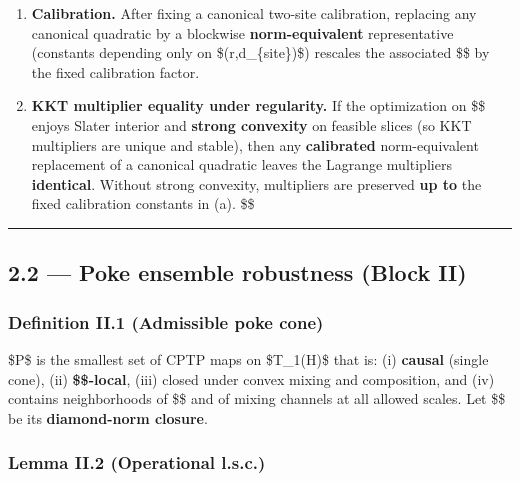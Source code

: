 \documentclass[
]{article}
\numberwithin{equation}{section}
\begin{document}
\begin{enumerate}
\def\labelenumi{(\alph{enumi})}
\item
  \textbf{Calibration.} After fixing a canonical two-site calibration,
  replacing any canonical quadratic by a blockwise
  \textbf{norm-equivalent} representative (constants depending only on
  \$(r,d\_\{\rm site\})\$) rescales the associated \$\alpha\$ by the
  fixed calibration factor.
\item
  \textbf{KKT multiplier equality under regularity.} If the optimization
  on \$\$ enjoys Slater interior and \textbf{strong
  convexity} on feasible slices (so KKT multipliers are unique and
  stable), then any \textbf{calibrated} norm-equivalent replacement of a
  canonical quadratic leaves the Lagrange multipliers
  \textbf{identical}. Without strong convexity, multipliers are
  preserved \textbf{up to} the fixed calibration constants in (a).
  \$\square\$
\end{enumerate}

\begin{center}\rule{0.5\linewidth}{0.5pt}\end{center}

\hypertarget{poke-ensemble-robustness-block-ii}{%
\subsection{2.2 --- Poke ensemble robustness (Block
II)}\label{poke-ensemble-robustness-block-ii}}

\hypertarget{definition-ii.1-admissible-poke-cone}{%
\subsubsection{Definition II.1 (Admissible poke
cone)}\label{definition-ii.1-admissible-poke-cone}}

\$\mathcal P\$ is the smallest set of CPTP maps on
\$\mathfrak T\_1(\mathcal H)\$ that is: (i) \textbf{causal} (single
cone), (ii) \textbf{\$\Gamma\$-local}, (iii) closed under convex mixing
and composition, and (iv) contains neighborhoods of \$\$ and
of mixing channels at all allowed scales. Let \$\$
be its \textbf{diamond-norm closure}.

\hypertarget{lemma-ii.2-operational-l.s.c.}{%
\subsubsection{Lemma II.2 (Operational
l.s.c.)}\label{lemma-ii.2-operational-l.s.c.}}
\end{document}
